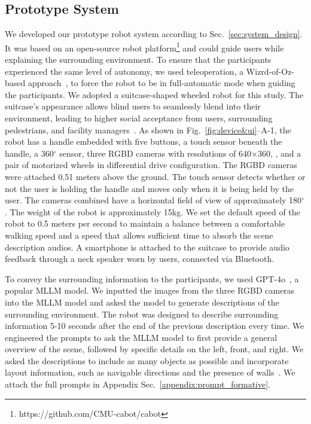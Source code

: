 \subsection{Prototype System}
We developed our prototype robot system according to Sec.~\ref{sec:system_design}. 
It was based on an open-source robot platform\footnote{https://github.com/CMU-cabot/cabot} and could guide users while explaining the surrounding environment. 
To ensure that the participants experienced the same level of autonomy, we used teleoperation, a Wizrd-of-Oz-based approach~\cite{riek2012wizard-of-oz}, to force the robot to be in full-automatic mode when guiding the participants.
We adopted a suitcase-shaped wheeled robot for this study.
The suitcase's appearance allows blind users to seamlessly blend into their environment, leading to higher social acceptance from users, surrounding pedestrians, and facility managers~\cite{kayukawa2022HowUsers}. 
As shown in Fig.~\ref{fig:device&ui}--A-1, the robot has a handle embedded with five buttons, a touch sensor beneath the handle, a 360$^\circ$  sensor, three RGBD cameras with resolutions of 640×360, , and a pair of motorized wheels in differential drive configuration.
The RGBD cameras were attached 0.51 meters above the ground.
The touch sensor detects whether or not the user is holding the handle and moves only when it is being held by the user. 
The cameras combined have a horizontal field of view of approximately 180$^\circ$.
The weight of the robot is approximately 15kg.
We set the default speed of the robot to 0.5 meters per second to maintain a balance between a comfortable walking speed and a speed that allows sufficient time to absorb the scene description audios.
A smartphone is attached to the suitcase to provide audio feedback through a neck speaker worn by users, connected via Bluetooth.

To convey the surrounding information to the participants, we used GPT-4o~\cite{GPT4o}, a popular MLLM model.
We inputted the images from the three RGBD cameras into the MLLM model and asked the model to generate descriptions of the surrounding environment.
The robot was designed to describe surrounding information 5-10 seconds after the end of the previous description every time. 
We engineered the prompts to ask the MLLM model to first provide a general overview of the scene, followed by specific details on the left, front, and right. 
We asked the descriptions to include as many objects as possible and incorporate layout information, such as navigable directions and the presence of walls~\cite{jain2023want}. 
We attach the full prompts in Appendix Sec.~\ref{appendix:prompt_formative}.

